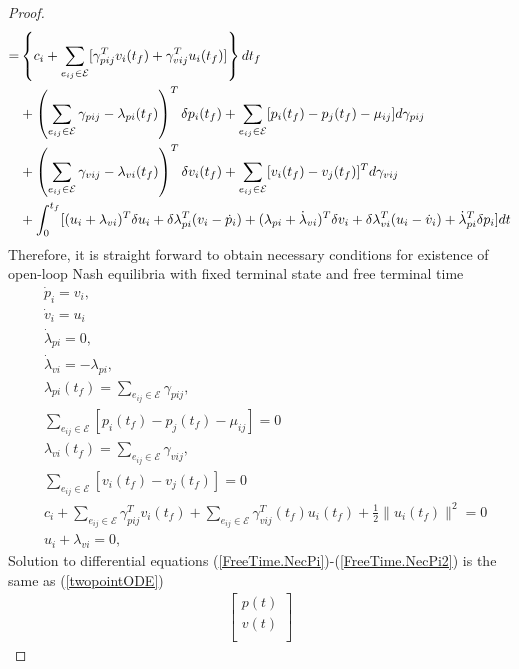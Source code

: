 \documentclass[12pt,draftcls,onecolumn]{IEEEtran}  %
\begin{document}
{\begin{proof}
\begin{align}
=&\left\{c_i+\sum_{e_{ij}\in\mathcal{E}} [\gamma^T_{pij} v_i(t_f)+\gamma^T_{vij} u_i(t_f)]\right\}dt_f\notag\\
&+\left(\sum_{e_{ij}\in\mathcal{E}}\gamma_{pij} -\lambda_{pi}(t_f)\right)^T\delta p_i(t_f)+\sum_{e_{ij}\in\mathcal{E}}[ p_i(t_f)-p_j(t_f)-\mu_{ij}]d\gamma_{pij}\notag\\
&+\left(\sum_{e_{ij}\in\mathcal{E}}\gamma_{vij} -\lambda_{vi}(t_f)\right)^T \delta v_i(t_f)+\sum_{e_{ij}\in\mathcal{E}}[ v_i(t_f)-v_j(t_f)]^Td\gamma_{vij}\notag\\
&+\int_0^{t_f} [(u_i+\lambda_{vi})^T\delta u_i + \delta \lambda_{pi}^T(v_i-\dot{p}_i)+ (\lambda_{pi}+\dot{\lambda}_{vi})^T\delta v_i
+\delta \lambda_{vi}^T(u_i-\dot{v}_i) +\dot{\lambda}_{pi}^T\delta p_i]\mbox{d}t\notag
\end{align}
Therefore, it is straight forward to obtain necessary conditions for existence of open-loop Nash equilibria with fixed terminal state and free terminal time
\begin{subequations}\begin{align}
&\dot{p}_{i}=v_i,\label{FreeTime.NecPi}\\ &\dot{v}_{i}=u_i\label{FreeTime.NecPi1}\\
&\dot{\lambda}_{pi}= 0,\\
&\dot{\lambda}_{vi}= -\lambda_{pi},\label{FreeTime.NecPi2}\\
&\lambda_{pi}(t_f)= \sum_{e_{ij}\in\mathcal{E}}\gamma_{pij}, \label{FreeTime.NecPi3}\\
&\sum_{e_{ij}\in\mathcal{E}} [p_i(t_f)-p_j(t_f)-\mu_{ij}]=0\label{FreeTime.NecPi5}\\
&\lambda_{vi}(t_f)= \sum_{e_{ij}\in\mathcal{E}}\gamma_{vij},\label{FreeTime.NecPi4}\\
&\sum_{e_{ij}\in\mathcal{E}} [v_i(t_f)-v_j(t_f)]=0\label{FreeTime.NecPi6}\\
&c_i+\sum_{e_{ij}\in\mathcal{E}}\gamma^T_{pij} v_i(t_f)+\sum_{e_{ij}\in\mathcal{E}}\gamma^T_{vij}(t_f)u_i(t_f)+ \frac{1}{2}\|u_i(t_f)\|^2=0\label{FreeTime.NecPi7}\\
&u_i+\lambda_{vi} =0,\label{NacUFreeTime}
\end{align}
\end{subequations}
Solution to differential equations (\ref{FreeTime.NecPi})-(\ref{FreeTime.NecPi2}) is the same as (\ref{twopointODE})
\begin{align}
\begin{bmatrix}
p(t)\\
v(t)\\

\end{bmatrix}
\end{align}
\end{proof}}
\end{document}
